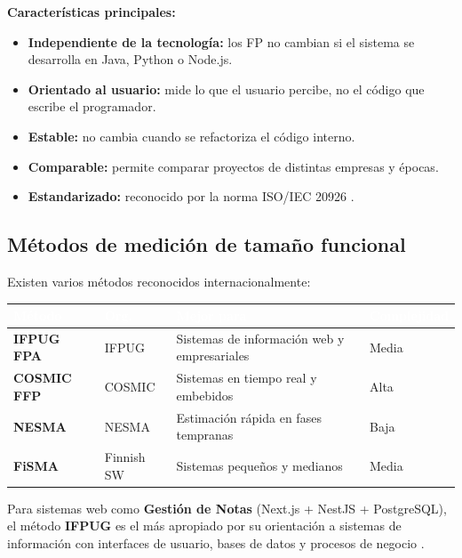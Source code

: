 \documentclass[12pt, a4paper]{article}
\begin{document}
\textbf{Características principales:}
\begin{itemize}[noitemsep, leftmargin=1.5cm]
  \item \textbf{Independiente de la tecnología:} los FP no cambian si el sistema
        se desarrolla en Java, Python o Node.js.
  \item \textbf{Orientado al usuario:} mide lo que el usuario percibe, no el
        código que escribe el programador.
  \item \textbf{Estable:} no cambia cuando se refactoriza el código interno.
  \item \textbf{Comparable:} permite comparar proyectos de distintas empresas y épocas.
  \item \textbf{Estandarizado:} reconocido por la norma ISO/IEC 20926 \parencite{iso2009}.
\end{itemize}

\subsection{Métodos de medición de tamaño funcional}

Existen varios métodos reconocidos internacionalmente:

\vspace{0.3cm}
\begin{tabular}{>{\bfseries}p{2.5cm} p{2cm} p{4.5cm} p{3cm}}
  \toprule
  \rowcolor{espeazul}
  \textcolor{white}{Método} & \textcolor{white}{Org.} &
  \textcolor{white}{Mejor para} & \textcolor{white}{Complejidad} \\
  \midrule
  IFPUG FPA & IFPUG & Sistemas de información web y empresariales & Media \\
  COSMIC FFP & COSMIC & Sistemas en tiempo real y embebidos & Alta \\
  NESMA & NESMA & Estimación rápida en fases tempranas & Baja \\
  FiSMA & Finnish SW & Sistemas pequeños y medianos & Media \\
  \bottomrule
\end{tabular}

\begin{notabox}
  Para sistemas web como \textbf{Gestión de Notas} (Next.js + NestJS + PostgreSQL),
  el método \textbf{IFPUG} es el más apropiado por su orientación a sistemas
  de información con interfaces de usuario, bases de datos y procesos de negocio
  \parencite{ifpug2010}.
\end{notabox}
\end{document}
